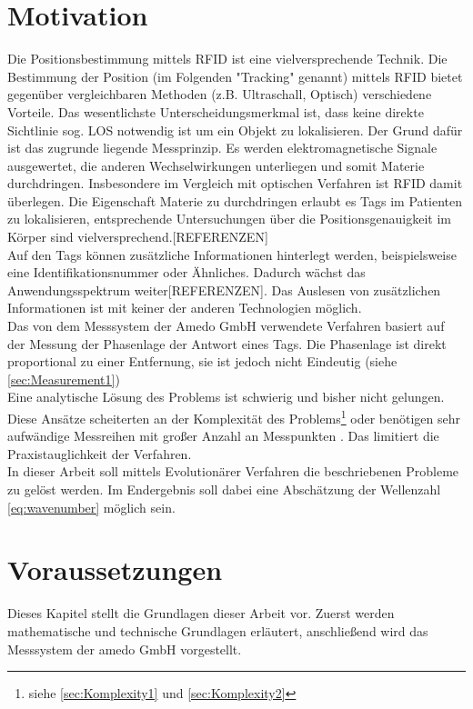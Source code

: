 \section[Motivation]{Motivation}
Die Positionsbestimmung mittels RFID ist eine vielversprechende Technik. Die Bestimmung der Position (im Folgenden "Tracking" genannt) mittels RFID  bietet gegenüber vergleichbaren Methoden (z.B. Ultraschall, Optisch) verschiedene Vorteile. Das wesentlichste Unterscheidungsmerkmal ist, dass keine direkte Sichtlinie sog. LOS notwendig ist um ein Objekt zu lokalisieren. Der Grund dafür ist das zugrunde liegende Messprinzip. Es werden elektromagnetische Signale ausgewertet, die anderen Wechselwirkungen unterliegen und somit Materie durchdringen. Insbesondere im Vergleich mit optischen Verfahren ist RFID damit überlegen. Die Eigenschaft Materie zu durchdringen erlaubt es Tags im Patienten zu lokalisieren, entsprechende Untersuchungen über die Positionsgenauigkeit im Körper sind vielversprechend.[REFERENZEN]\\
Auf den Tags können zusätzliche Informationen hinterlegt werden, beispielsweise eine Identifikationsnummer oder Ähnliches. Dadurch wächst das Anwendungsspektrum weiter[REFERENZEN]. Das Auslesen von zusätzlichen Informationen ist mit keiner der anderen Technologien möglich.\\
Das von dem Messsystem der {Amedo GmbH} verwendete Verfahren basiert auf der Messung der Phasenlage der Antwort eines Tags. Die Phasenlage ist direkt proportional zu einer Entfernung, sie ist jedoch nicht Eindeutig (siehe \ref{sec:Measurement1})\\

Eine analytische Lösung des Problems ist schwierig und bisher nicht gelungen. Diese Ansätze scheiterten an der Komplexität des Problems\footnote{siehe \ref{sec:Komplexity1} und \ref{sec:Komplexity2}} oder benötigen sehr aufwändige Messreihen mit großer Anzahl an Messpunkten \cite{amedo1}. Das limitiert die Praxistauglichkeit der Verfahren.\\

In dieser Arbeit soll mittels Evolutionärer Verfahren die beschriebenen Probleme zu gelöst werden. Im Endergebnis soll dabei eine Abschätzung der Wellenzahl \ref{eq:wavenumber} möglich sein.
%
\section{Voraussetzungen}
%
Dieses Kapitel stellt die Grundlagen dieser Arbeit vor. Zuerst werden mathematische und technische Grundlagen erläutert, anschließend wird das Messsystem der amedo GmbH vorgestellt.
%

%
